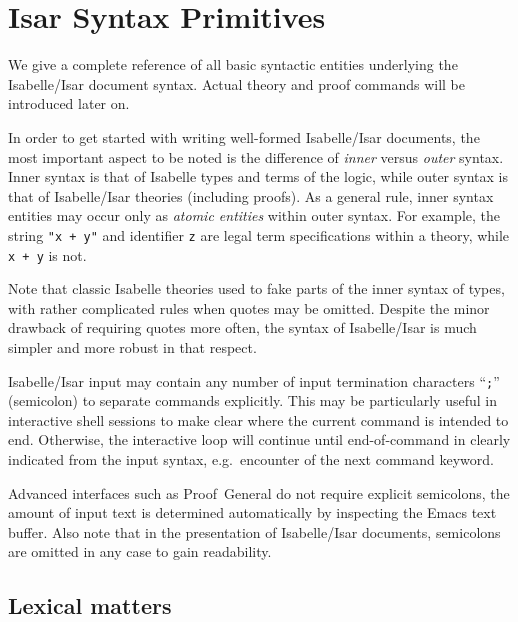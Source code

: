 
\chapter{Isar Syntax Primitives}

We give a complete reference of all basic syntactic entities underlying the
Isabelle/Isar document syntax.  Actual theory and proof commands will be
introduced later on.

\medskip

In order to get started with writing well-formed Isabelle/Isar documents, the
most important aspect to be noted is the difference of \emph{inner} versus
\emph{outer} syntax.  Inner syntax is that of Isabelle types and terms of the
logic, while outer syntax is that of Isabelle/Isar theories (including
proofs).  As a general rule, inner syntax entities may occur only as
\emph{atomic entities} within outer syntax.  For example, the string
\texttt{"x + y"} and identifier \texttt{z} are legal term specifications
within a theory, while \texttt{x + y} is not.

\begin{warn}
  Note that classic Isabelle theories used to fake parts of the inner syntax
  of types, with rather complicated rules when quotes may be omitted.  Despite
  the minor drawback of requiring quotes more often, the syntax of
  Isabelle/Isar is much simpler and more robust in that respect.
\end{warn}

\medskip

Isabelle/Isar input may contain any number of input termination characters
``\texttt{;}'' (semicolon) to separate commands explicitly.  This may be
particularly useful in interactive shell sessions to make clear where the
current command is intended to end.  Otherwise, the interactive loop will
continue until end-of-command in clearly indicated from the input syntax,
e.g.\ encounter of the next command keyword.

Advanced interfaces such as Proof~General \cite{proofgeneral} do not require
explicit semicolons, the amount of input text is determined automatically by
inspecting the Emacs text buffer.  Also note that in the presentation of
Isabelle/Isar documents, semicolons are omitted in any case to gain
readability.


\section{Lexical matters}\label{sec:lex-syntax}

